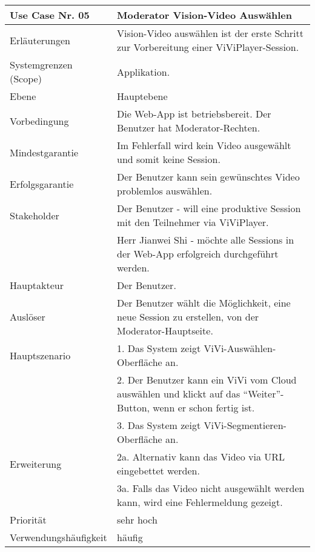 \begin{tabularx}{\linewidth}{|l|X|}
	\hline
	Use Case Nr. 05			& \textbf{Moderator Vision-Video Auswählen} \\ \hline
	Erläuterungen			& Vision-Video auswählen ist der erste Schritt zur Vorbereitung 
							  einer ViViPlayer-Session. \\ \hline
	Systemgrenzen (Scope)	& Applikation. \\ \hline
	Ebene					& Hauptebene \\ \hline
	Vorbedingung			& Die Web-App ist betriebsbereit. Der Benutzer hat 
							  Moderator-Rechten. \\ \hline
	Mindestgarantie			& Im Fehlerfall wird kein Video ausgewählt und somit keine 
							  Session.\\ \hline
	Erfolgsgarantie			& Der Benutzer kann sein gewünschtes Video problemlos auswählen. 
							  \\ \hline
	Stakeholder				& Der Benutzer - will eine produktive Session mit den Teilnehmer 
							  via ViViPlayer. \\
							& Herr Jianwei Shi - möchte alle Sessions in der Web-App 
							  erfolgreich durchgeführt werden. \\ \hline
	Hauptakteur				& Der Benutzer. \\ \hline
	Auslöser				& Der Benutzer wählt die Möglichkeit, eine neue Session zu 
							  erstellen, von der Moderator-Hauptseite. \\ \hline	
	Hauptszenario			& 1. Das System zeigt ViVi-Auswählen-Oberfläche an. \\
							& 2. Der Benutzer kann ein ViVi vom Cloud auswählen und klickt auf das ``Weiter''-Button, wenn er schon fertig ist. \\
							& 3. Das System zeigt ViVi-Segmentieren-Oberfläche an. \\ \hline
	Erweiterung				& 2a. Alternativ kann das Video via URL eingebettet werden. \\ 
							& 3a. Falls das Video nicht ausgewählt werden kann, wird eine 
							  Fehlermeldung gezeigt. \\ \hline
	Priorität				& sehr hoch \\ \hline
	Verwendungshäufigkeit	& häufig \\ \hline
\end{tabularx}